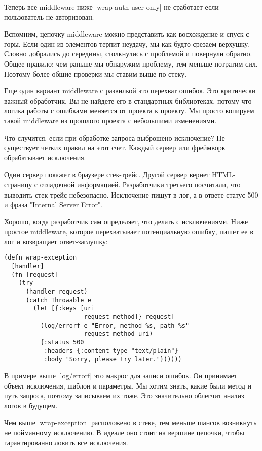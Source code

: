 Теперь все middleware ниже \spverb|wrap-auth-user-only| не сработает если пользователь
не авторизован.

Вспомним, цепочку middleware можно представить как восхождение и спуск с
горы. Если один из элементов терпит неудачу, мы как будто срезаем
верхушку. Словно добрались до середины, столкнулись с проблемой и повернули
обратно. Общее правило: чем раньше мы обнаружим проблему, тем меньше потратим
сил. Поэтому более общие проверки мы ставим выше по стеку.

Еще один вариант middleware с развилкой это перехват ошибок. Это критически
важный обработчик. Вы не найдете его в стандартных библиотеках, потому что
логика работы с ошибками меняется от проекта к проекту. Мы просто копируем такой
middleware из прошлого проекта с небольшими изменениями.

Что случится, если при обработке запроса выброшено исключение? Не существует
четких правил на этот счет. Каждый сервер или фреймворк обрабатывает исключения.

Один сервер покажет в браузере стек-трейс. Другой сервер вернет HTML-страницу с
отладочной информацией. Разработчики третьего посчитали, что выводить стек-трейс
небезопасно. Исключение пишут в лог, а в ответе статус 500 и фраза "Internal
Server Error".

Хорошо, когда разработчик сам определяет, что делать с исключениями. Ниже
простое middleware, которое перехватывает потенциальную ошибку, пишет ее в лог и
возвращает ответ-заглушку:

\begin{verbatim}
(defn wrap-exception
  [handler]
  (fn [request]
    (try
      (handler request)
      (catch Throwable e
        (let [{:keys [uri
                      request-method]} request]
          (log/errorf e "Error, method %s, path %s"
                      request-method uri)
          {:status 500
           :headers {:content-type "text/plain"}
           :body "Sorry, please try later."})))))
\end{verbatim}

В примере выше \spverb|log/errorf| это макрос для записи ошибок. Он принимает объект
исключения, шаблон и параметры. Мы хотим знать, какие были метод и путь запроса,
поэтому записываем их тоже. Это значительно облегчит анализ логов в будущем.

Чем выше \spverb|wrap-exception| расположено в стеке, тем меньше шансов возникнуть не
пойманному исключению. В идеале оно стоит на вершине цепочки, чтобы
гарантированно ловить все исключения.

